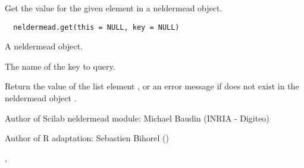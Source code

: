 %
\begin{Description}\relax
Get the value for the given element in a neldermead object.
\end{Description}
%
\begin{Usage}
\begin{verbatim}
  neldermead.get(this = NULL, key = NULL)
\end{verbatim}
\end{Usage}
%
\begin{Arguments}
\begin{ldescription}
\item[\code{this}] A neldermead object.
\item[\code{key}] The name of the key to query.
\end{ldescription}
\end{Arguments}
%
\begin{Value}
Return the value of the list element , or an error message if
 does not exist in the neldermead object .
\end{Value}
%
\begin{Author}\relax
Author of Scilab neldermead module: Michael Baudin (INRIA - Digiteo)

Author of R adaptation: Sebastien Bihorel ()
\end{Author}
%
\begin{SeeAlso}\relax
{},
\end{SeeAlso}
